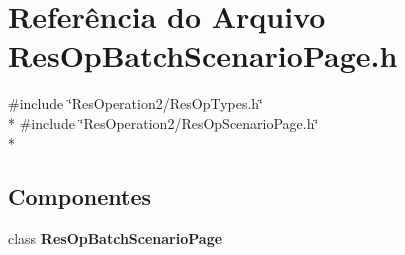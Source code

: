 \section{Referência do Arquivo Res\+Op\+Batch\+Scenario\+Page.\+h}
\label{_res_op_batch_scenario_page_8h}
{\ttfamily \#include \char`\"{}Res\+Operation2/\+Res\+Op\+Types.\+h\char`\"{}}\\*
{\ttfamily \#include \char`\"{}Res\+Operation2/\+Res\+Op\+Scenario\+Page.\+h\char`\"{}}\\*
\subsection*{Componentes}
\begin{DoxyCompactItemize}
\item 
class {\bf Res\+Op\+Batch\+Scenario\+Page}
\end{DoxyCompactItemize}
